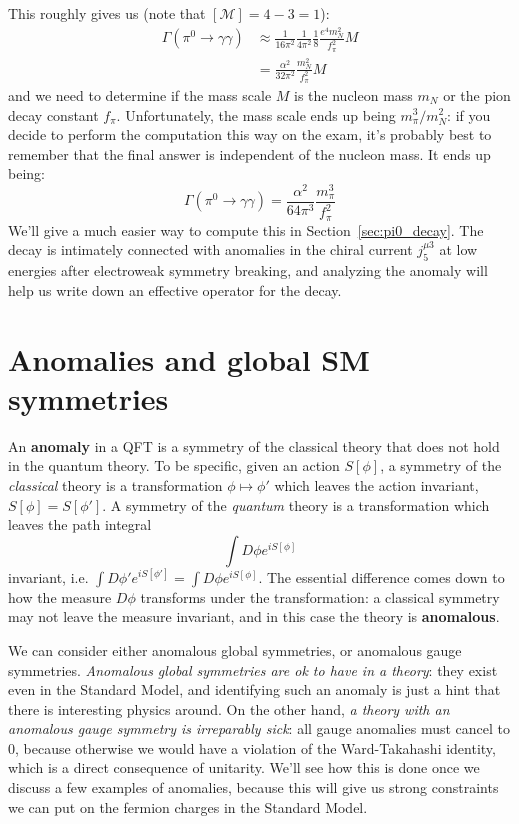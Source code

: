 \documentclass[11pt, oneside]{article}   	%
\theoremstyle{definition}
\numberwithin{equation}{subsection}		%
\begin{document}
This roughly gives us (note that $[\mathcal M] = 4 - 3 = 1$):
\begin{align}
	\Gamma(\pi^0\rightarrow\gamma\gamma)&\approx \frac{1}{16\pi^2}\frac{1}{4\pi^2} \frac{1}{8}\frac{e^4 m_N^2}{f_\pi^2} M \nonumber \\
	&= \frac{\alpha^2}{32\pi^2} \frac{m_N^2}{f_\pi^2}M
\end{align}
and we need to determine if the mass scale $M$ is the nucleon mass $m_N$ or the pion decay constant $f_\pi$. Unfortunately, the mass 
scale ends up being $m_\pi^3 / m_N^2$: if you decide to perform the computation this way on the exam, it's probably best to remember 
that the final answer is independent of the nucleon mass. It ends up being:
\begin{equation}
	\Gamma(\pi^0\rightarrow\gamma\gamma) = \frac{\alpha^2}{64\pi^3} \frac{m_\pi^3}{f_\pi^2}
\end{equation}
We'll give a much easier way to compute this in Section~\ref{sec:pi0_decay}. The decay is intimately connected with anomalies in the chiral current $j_5^{\mu 3}$ 
at low energies after electroweak symmetry breaking, and analyzing the anomaly will help us write down an effective operator for the decay. 

\newpage
\section{Anomalies and global SM symmetries}
\label{sec:anomalies}

An \textbf{anomaly} in a QFT is a symmetry of the classical theory that does not hold in the quantum theory. To be specific, given an 
action $S[\phi]$, a symmetry of the \textit{classical} theory is a transformation $\phi\mapsto \phi'$ which leaves the action invariant, 
$S[\phi] = S[\phi']$. A symmetry of the \textit{quantum} theory is a transformation which leaves the path integral
\begin{equation}
	\int D\phi e^{iS[\phi]}
\end{equation}
invariant, i.e. $\int D\phi' e^{iS[\phi']} = \int D\phi e^{iS[\phi]}$. The essential difference comes down to how the measure $D\phi$ transforms 
under the transformation: a classical symmetry may not leave the measure invariant, and in this case the theory is \textbf{anomalous}. 

We can consider either anomalous global symmetries, or anomalous gauge symmetries. \textit{Anomalous global symmetries are ok to have 
in a theory}: they exist even in the Standard Model, and identifying such an anomaly is just a hint that there is interesting physics around.
On the other hand, \textit{a theory with an anomalous gauge symmetry is irreparably sick}: all gauge anomalies must cancel to 0, because 
otherwise we would have a violation of the Ward-Takahashi identity, which is a direct consequence of unitarity. We'll see how this is done 
once we discuss a few examples of anomalies, because this will give us strong constraints we can put on the fermion charges in the 
Standard Model. 
\end{document}
